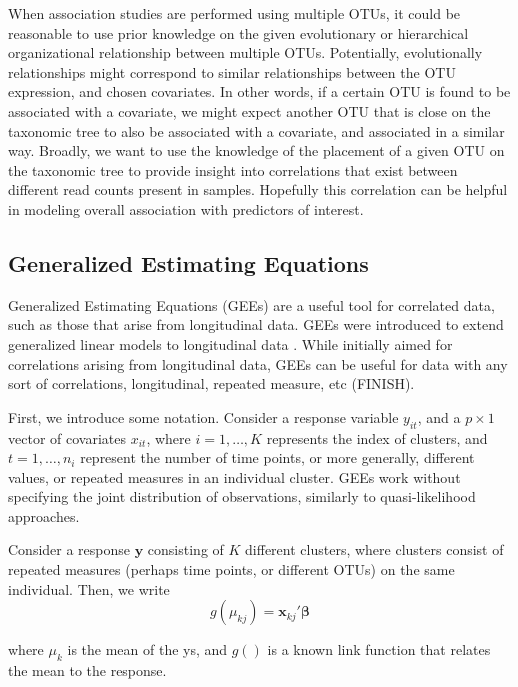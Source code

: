 \documentclass[12pt]{article}
\begin{document}
\cite{washburne2018methods}

When association studies are performed using multiple OTUs, it could be reasonable to use prior knowledge on the given evolutionary or hierarchical organizational relationship between multiple OTUs. Potentially, evolutionally relationships might correspond to similar relationships between the OTU expression, and chosen covariates. In other words, if a certain OTU is found to be associated with a covariate, we might expect another OTU that is close on the taxonomic tree to also be associated with a covariate, and associated in a similar way. Broadly, we want to use the knowledge of the placement of a given OTU on the taxonomic tree to provide insight into correlations that exist between different read counts present in samples. Hopefully this correlation can be helpful in modeling overall association with predictors of interest.





\subsection{Generalized Estimating Equations}

Generalized Estimating Equations (GEEs) are a useful tool for correlated data, such as those that arise from longitudinal data. GEEs were introduced to extend generalized linear models to longitudinal data \cite{liang1986longitudinal}. While initially aimed for correlations arising from longitudinal data, GEEs can be useful for data with any sort of correlations, longitudinal, repeated measure, etc (FINISH).



First, we introduce some notation. Consider a response variable $y_{it}$, and a $p \times 1$ vector of covariates $x_{it}$, where $i = 1, \ldots , K$ represents the index of clusters, and $t = 1, \ldots , n_i$ represent the number of time points, or more generally, different values, or repeated measures in an individual cluster. GEEs work without specifying the joint distribution of observations, similarly to quasi-likelihood approaches.

Consider a response $\mathbf{y}$ consisting of $K$ different clusters, where clusters consist of repeated measures (perhaps time points, or different OTUs) on the same individual. Then, we write
$$g(\mu_{kj}) = \mathbf{x}_{kj}'\boldsymbol \beta$$

where $\mu_{k}$ is the mean of the ys, and $g()$ is a known link function that relates the mean to the response.
\end{document}
